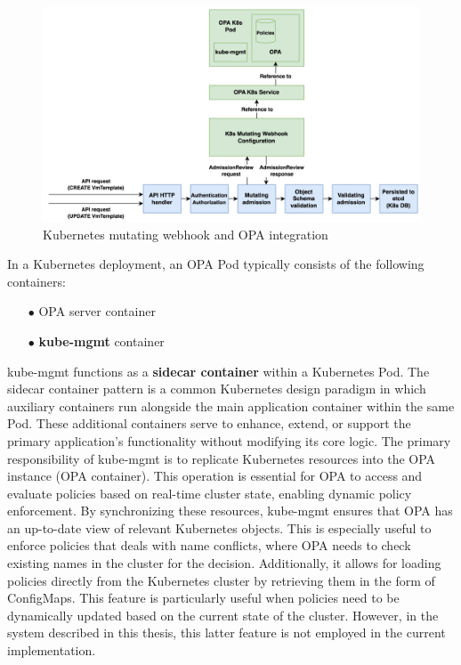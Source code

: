 \begin{figure}[htb]
\centering
\includegraphics[width=1\linewidth]{images/webhook.png}
\caption{Kubernetes mutating webhook and OPA integration}
\label{fig:webhook_opa}
\end{figure}



In a Kubernetes deployment, an OPA Pod typically consists of the following containers:
\begin{itemize}[itemsep=0.2pt, topsep=1pt]
  \item[$\bullet$] OPA server container
  \item[$\bullet$] \textbf{kube-mgmt} container \\
\end{itemize} 

kube-mgmt functions as a \textbf{sidecar container} within a Kubernetes Pod. The sidecar container pattern is a common Kubernetes design paradigm in which auxiliary containers run alongside the main application container within the same Pod. These additional containers serve to enhance, extend, or support the primary application's functionality without modifying its core logic.  %
The primary responsibility of kube-mgmt is to replicate Kubernetes resources into the OPA instance (OPA container). This operation is essential for OPA to access and evaluate policies based on real-time cluster state, enabling dynamic policy enforcement. By synchronizing these resources, kube-mgmt ensures that OPA has an up-to-date view of relevant Kubernetes objects.
This is especially useful to enforce policies that deals with name conflicts, where OPA needs to check existing names in the cluster for the decision.
Additionally, it allows for loading policies directly from the Kubernetes cluster by retrieving them in the form of ConfigMaps. This feature is particularly useful when policies need to be dynamically updated based on the current state of the cluster. However, in the system described in this thesis, this latter feature is not employed in the current implementation. %


